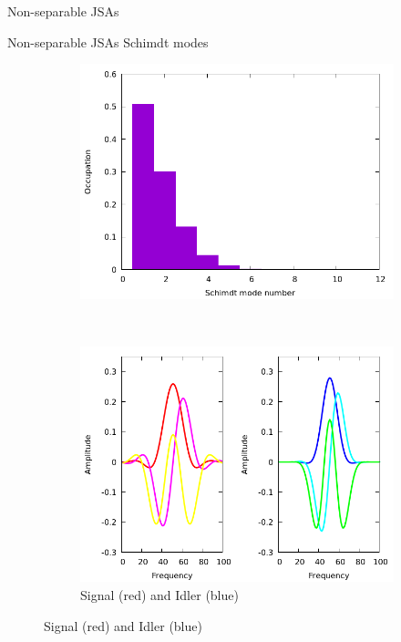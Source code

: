\documentclass{beamer}
\begin{document}
\begin{frame}{Non-separable JSAs} 
    \begin{figure}
        \centering
        \end{figure}
    \end{frame}
%
    \begin{frame}{Non-separable JSAs Schimdt modes}
    \begin{figure}
        \centering
        \begin{subfigure}{0.4\textwidth}
            \includegraphics[width=1\textwidth]{notsepschmidtmodesocc.png}
        \end{subfigure}
        ~
        \begin{subfigure}{0.5\textwidth}
        \includegraphics[width=1\textwidth]{notsepsingle_sig_idler1.png}
        \caption{Signal (red) and Idler (blue)}
        \end{subfigure}
    \end{figure}

\end{frame} 
\end{document}
